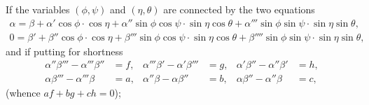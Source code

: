 \documentclass[11pt,a4paper]{article}
\theoremstyle{plain}
\theoremstyle{definition}
\theoremstyle{remark}
\begin{document}
If the variables $(\phi, \psi)$ and $(\eta, \theta)$ are connected by the two equations
\begin{gather*}
\alpha = \beta + \alpha' \cos \phi \cdot \cos \eta + \alpha'' \sin \phi \cos \psi \cdot \sin \eta \cos \theta + \alpha''' \sin \phi \sin \psi \cdot \sin \eta \sin \theta, \\
0 = \beta' + \beta'' \cos \phi \cdot \cos \eta + \beta''' \sin \phi \cos \psi \cdot \sin \eta \cos \theta + \beta'''' \sin \phi \sin \psi \cdot \sin \eta \sin \theta,
\end{gather*}
and if putting for shortness
\begin{align*}
\alpha'' \beta''' - \alpha''' \beta'' &= f, & \alpha''' \beta' - \alpha' \beta''' &= g, & \alpha' \beta'' - \alpha'' \beta' &= h, \\
\alpha \beta''' - \alpha''' \beta &= a, & \alpha'' \beta - \alpha \beta'' &= b, & \alpha \beta'' - \alpha'' \beta &= c,
\end{align*}
(whence $af + bg + ch = 0$);

\newpage
\end{document}
